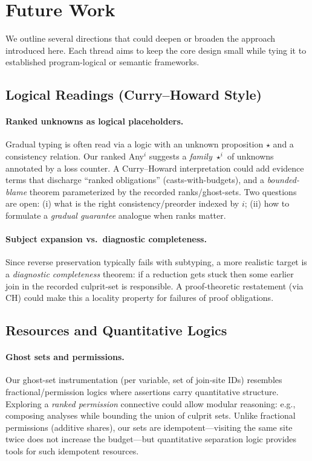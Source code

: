 \section{Future Work}
\label{sec:future}

We outline several directions that could deepen or broaden the approach introduced here. Each thread aims to keep the core design small while tying it to established program-logical or semantic frameworks.

\subsection{Logical Readings (Curry--Howard Style)}
\paragraph{Ranked unknowns as logical placeholders.}
Gradual typing is often read via a logic with an unknown proposition $\star$ and a consistency relation.
Our ranked \textsf{Any}$^{i}$ suggests a \emph{family} $\star^{i}$ of unknowns annotated by a loss counter.
A Curry--Howard interpretation could add evidence terms that discharge ``ranked obligations'' (casts-with-budgets), and a \emph{bounded-blame} theorem parameterized by the recorded ranks/ghost-sets.
Two questions are open: (i) what is the right consistency/preorder indexed by $i$; (ii) how to formulate a \emph{gradual guarantee} analogue when ranks matter.

\paragraph{Subject expansion vs.\ diagnostic completeness.}
Since reverse preservation typically fails with subtyping, a more realistic target is a \emph{diagnostic completeness} theorem:
if a reduction gets stuck then some earlier join in the recorded culprit-set is responsible.
A proof-theoretic restatement (via CH) could make this a locality property for failures of proof obligations.

\subsection{Resources and Quantitative Logics}
\paragraph{Ghost sets and permissions.}
Our ghost-set instrumentation (per variable, set of join-site IDs) resembles fractional/permission logics where assertions carry quantitative structure.
Exploring a \emph{ranked permission} connective could allow modular reasoning:
e.g., composing analyses while bounding the union of culprit sets.
Unlike fractional permissions (additive shares), our sets are idempotent---visiting the same site twice does not increase the budget---but quantitative separation logic provides tools for such idempotent resources.

